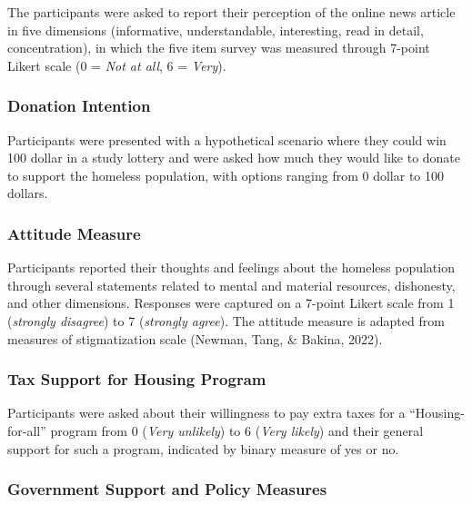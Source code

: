 \documentclass[
  man]{apa6}
\begin{document}
The participants were asked to report their perception of the online news article in five dimensions (informative, understandable, interesting, read in detail, concentration), in which the five item survey was measured through 7-point Likert scale (0 = \emph{Not at all}, 6 = \emph{Very}).

\hypertarget{donation-intention}{%
\subsubsection{Donation Intention}\label{donation-intention}}

Participants were presented with a hypothetical scenario where they could win 100 dollar in a study lottery and were asked how much they would like to donate to support the homeless population, with options ranging from 0 dollar to 100 dollars.

\hypertarget{attitude-measure}{%
\subsubsection{Attitude Measure}\label{attitude-measure}}

Participants reported their thoughts and feelings about the homeless population through several statements related to mental and material resources, dishonesty, and other dimensions. Responses were captured on a 7-point Likert scale from 1 (\emph{strongly disagree}) to 7 (\emph{strongly agree}). The attitude measure is adapted from measures of stigmatization scale (Newman, Tang, \& Bakina, 2022).

\hypertarget{tax-support-for-housing-program}{%
\subsubsection{Tax Support for Housing Program}\label{tax-support-for-housing-program}}

Participants were asked about their willingness to pay extra taxes for a ``Housing-for-all'' program from 0 (\emph{Very unlikely}) to 6 (\emph{Very likely}) and their general support for such a program, indicated by binary measure of yes or no.

\hypertarget{government-support-and-policy-measures}{%
\subsubsection{Government Support and Policy Measures}\label{government-support-and-policy-measures}}
\end{document}
